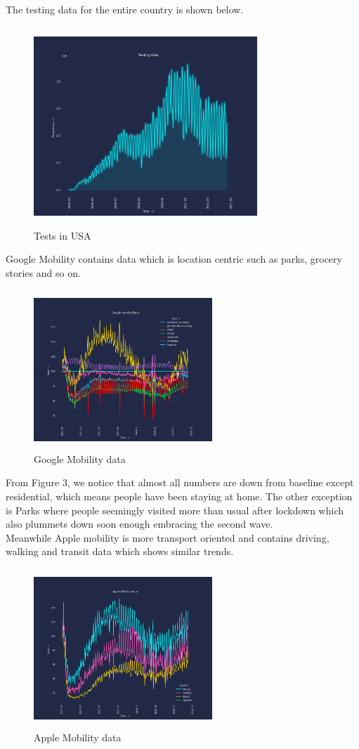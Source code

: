 \documentclass[12pt,a4paper]{article}
\begin{document}
The testing data for the entire country is shown below.
\begin{figure}[H]
    \centering
    \includegraphics[width=0.75\textwidth,height=75mm]{images/usa/tests.png}
    \caption{Tests in USA}
\end{figure}
Google Mobility contains data which is location
centric such as parks, grocery stories and so on. 
\begin{figure}[H]
    \centering
    \includegraphics[width=0.6\textwidth,height=60mm]{images/usa/google.png}
    \caption{Google Mobility data}
\end{figure}
From Figure 3, we notice that almost all numbers are down from baseline
except residential, which means people have been staying at home. The other 
exception is Parks where people seemingly visited more than usual after 
lockdown which also plummets down soon enough embracing the second wave.
\\
Meanwhile Apple mobility is more transport oriented and contains driving, walking and transit data which 
shows similar trends.
\begin{figure}[H]
    \centering
    \includegraphics[width=0.6\textwidth,height=60mm]{images/apple.png}
    \caption{Apple Mobility data}
\end{figure}
\end{document}
